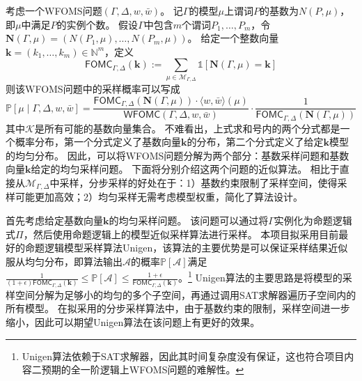 \documentclass[12pt,UTF8,AutoFakeBold=3,a4paper]{ctexart} %
\newcommand{\sentence}{\Gamma}
\newcommand{\weight}{w}
\newcommand{\negweight}{\bar{w}}
\newcommand{\wfoms}{WFOMS}
\newcommand{\symwfomc}{\ensuremath{\mathsf{WFOMC}}}
\newcommand{\symfomc}{\ensuremath{\mathsf{FOMC}}}
\newcommand{\indicator}{\mathds{1}}
\newcommand{\cardinality}{\mathbf{N}}
\newcommand{\domain}{\Delta}
\newcommand{\veck}{\mathbf{k}}
\newcommand{\nat}{\mathbb{N}}
\newcommand{\pro}{\mathbb{P}}
\newcommand{\fomodels}[2]{\mathcal{M}_{#1, #2}}
\newcommand{\structure}{\mathcal{A}}
\newcommand{\typeweight}[1]{\langle \weight, \negweight\rangle(#1)}
\begin{document}
考虑一个\wfoms{}问题$(\sentence, \domain, \weight, \negweight)$。
记$\sentence$的模型$\mu$上谓词$P$的基数为$N(P, \mu)$，即$\mu$中满足$P$的实例个数。
假设$\sentence$中包含$m$个谓词$P_1, \dots, P_m$，令$\cardinality(\sentence, \mu) = (N(P_1, \mu), \dots, N(P_m, \mu))$。
给定一个整数向量$\veck=(k_1,\dots, k_m)\in\nat^m$，定义
\begin{equation*}
  \symfomc_{\sentence,\domain}(\veck) := \sum_{\mu\in\fomodels{\sentence}{\domain}} \indicator[\cardinality(\sentence, \mu) = \veck]
\end{equation*}
则该\wfoms{}问题中的采样概率可以写成
\begin{equation}
    \pro[\mu\mid \sentence, \domain, \weight, \negweight] = \frac{\symfomc_{\sentence,\domain}(\cardinality(\sentence, \mu))\cdot \typeweight{\mu}}{\symwfomc(\sentence, \domain, \weight, \negweight)}\cdot \frac{1}{\symfomc_{\sentence,\domain}(\cardinality(\sentence, \mu))}
\end{equation}
其中$\mathcal{K}$是所有可能的基数向量集合。
不难看出，上式求和号内的两个分式都是一个概率分布，第一个分式定义了基数向量$\veck$的分布，第二个分式定义了给定$\veck$模型的均匀分布。
因此，可以将\wfoms{}问题分解为两个部分：基数采样问题和基数向量$\veck$给定的均匀采样问题。
下面将分别介绍这两个问题的近似算法。
相比于直接从$\fomodels{\sentence}{\domain}$中采样，分步采样的好处在于：1）基数约束限制了采样空间，使得采样可能更加高效；2）均匀采样无需考虑模型权重，简化了算法设计。

首先考虑给定基数向量$\veck$的均匀采样问题。
该问题可以通过将$\sentence$实例化为命题逻辑式$\Pi$，然后使用命题逻辑上的模型近似采样算法进行采样。
本项目拟采用目前最好的命题逻辑模型采样算法Unigen，该算法的主要优势是可以保证采样结果近似服从均匀分布，即算法输出$\structure$的概率$\pro[\structure]$满足$\frac{1}{(1+\epsilon)\symfomc_{\sentence,\domain}(\veck)} \le \pro[\structure] \le \frac{1+\epsilon}{\symfomc_{\sentence,\domain}(\veck)}$。\footnote{Unigen算法依赖于SAT求解器，因此其时间复杂度没有保证，这也符合项目内容二预期的全一阶逻辑上\wfoms{}问题的难解性。}
Unigen算法的主要思路是将模型的采样空间分解为足够小的均匀的多个子空间，再通过调用SAT求解器遍历子空间内的所有模型。
在拟采用的分步采样算法中，由于基数约束的限制，采样空间进一步缩小，因此可以期望Unigen算法在该问题上有更好的效果。
\end{document}
